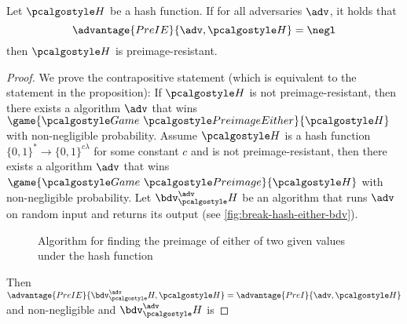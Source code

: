 \begin{proposition}
  Let $\algo{H}$ be a hash function. If for all \ppt adversaries $\adv$, it holds that
  \[
  \advantage{PreIE}{\adv, \algo{H}} = \negl
  \]
  then $\algo{H}$ is preimage-resistant.
\end{proposition}
\begin{proof}
  We prove the contrapositive statement (which is equivalent to the statement in the proposition):
  If $\algo{H}$ is not preimage-resistant, then there exists a \ppt algorithm $\adv$ that wins $\game{\Game~\algo{PreimageEither}}{\algo{H}}$ with non-negligible probability.
  Assume $\algo{H}$ is a hash function $\{0,1\}^* \rightarrow \{0,1\}^{c\lambda}$ for some constant $c$ and is not preimage-resistant, then there exists a \ppt algorithm $\adv$ that wins $\game{\Game~\algo{Preimage}}{\algo{H}}$ with non-negligible probability.
  Let $\bdv^\adv_\algo{H}$ be an algorithm that runs $\adv$ on random input and returns its output (see \autoref{fig:break-hash-either-bdv}).
  \begin{figure}[tbhp]
  \begin{center}
    \begin{tcolorbox}[width=5cm]
      \begin{pchstack}[center]
      \end{pchstack}
    \end{tcolorbox}
  \end{center}
  \caption{Algorithm for finding the preimage of either of two given values under the hash function \label{fig:break-hash-either-bdv}}
  \end{figure}

  Then $\advantage{PreIE}{\bdv^\adv_\algo{H}, \algo{H}} = \advantage{PreI}{\adv, \algo{H}}$ and non-negligible and $\bdv^\adv_\algo{H}$ is \ppt
\end{proof}


